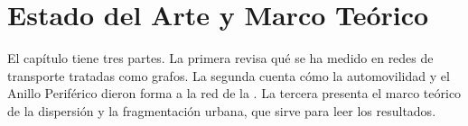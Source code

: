 
\chapter{Estado del Arte y Marco Teórico}
\label{ch:marco-teorico}

El capítulo tiene tres partes. La primera revisa qué se ha medido en redes de
transporte tratadas como grafos. La segunda cuenta cómo la automovilidad y el
Anillo Periférico dieron forma a la red de la \zmvm{}. La tercera presenta el
marco teórico de la dispersión y la fragmentación urbana, que sirve para leer
los resultados.




